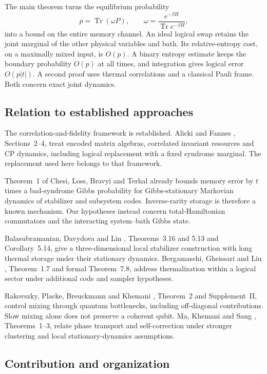 \documentclass[11pt,reqno]{amsart}
\numberwithin{equation}{section}
\theoremstyle{definition}
\theoremstyle{remark}
\newcommand{\Tr}{\operatorname{Tr}}
\begin{document}
The main theorem turns the equilibrium probability
\[
                  p=\Tr(\omega P),\qquad
                  \omega=\frac{e^{-\beta H}}{\Tr e^{-\beta H}},
\]
into a bound on the entire memory channel. An ideal logical swap retains the
joint marginal of the other physical variables and bath.
Its relative-entropy cost, on a maximally mixed input, is \(O(p)\).
A binary entropy estimate keeps the boundary probability \(O(p)\) at all
times, and integration gives logical error \(O(p|t|)\).
A second proof uses thermal correlations and a classical Pauli frame.
Both concern exact joint dynamics.

\subsection{Relation to established approaches}

The correlation-and-fidelity framework is established.
Alicki and Fannes \cite{AF09}, Sections~2--4, treat encoded matrix algebras,
correlated invariant resources and CP dynamics, including logical replacement
with a fixed syndrome marginal. The replacement used here belongs to
that framework.

Theorem~1 of Chesi, Loss, Bravyi and Terhal \cite{CLBT10} already bounds
memory error by \(t\) times a bad-syndrome Gibbs probability for
Gibbs-stationary Markovian dynamics of stabilizer and subsystem codes.
Inverse-rarity storage is therefore a known mechanism. Our hypotheses
instead concern total-Hamiltonian commutators and the interacting
system--bath Gibbs state.

Balasubramanian, Davydova and Lin \cite{BDL26}, Theorems~3.16 and 5.13
and Corollary~5.14, give a three-dimensional local stabilizer construction
with long thermal storage under their stationary dynamics.
Bergamaschi, Gheissari and Liu \cite{BGL25}, Theorem~1.7 and formal
Theorem~7.8, address thermalization within a logical sector under
additional code and sampler hypotheses.

Rakovszky, Placke, Breuckmann and Khemani \cite{RPBK26}, Theorem~2 and
Supplement~II, control mixing through quantum bottlenecks, including
off-diagonal contributions. Slow mixing alone does not preserve a coherent
qubit. Ma, Khemani and Sang \cite{MKS26}, Theorems~1--3, relate phase
transport and self-correction under stronger clustering and local
stationary-dynamics assumptions.

\subsection{Contribution and organization}
\end{document}
